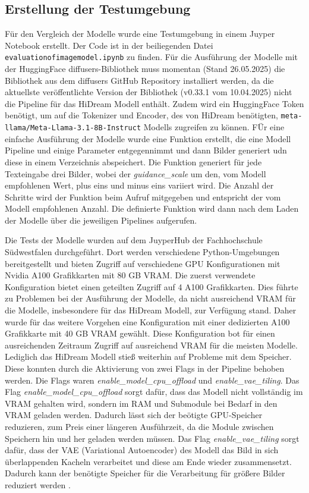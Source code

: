 \subsection{Erstellung der Testumgebung}
Für den Vergleich der Modelle wurde eine Testumgebung in einem Juyper Notebook erstellt. Der Code ist in der beiliegenden Datei \texttt{evaluation\-of\-image\-model.ipynb} zu finden. 
Für die Ausführung der Modelle mit der HuggingFace diffusers-Bibliothek \cite{von-platen-etal-2022-diffusers} muss momentan (Stand 26.05.2025) die Bibliothek aus dem diffusers GitHub Repository installiert werden, da die aktuellste veröffentlichte Version der Bibliothek (v0.33.1 vom 10.04.2025) nicht die Pipeline für das HiDream Modell enthält. Zudem wird ein HuggingFace Token benötigt, um auf die Tokenizer und Encoder, des von HiDream benötigten, \texttt{meta-llama/Meta-Llama-3.1-8B-Instruct} Modells zugreifen zu können.
FÜr eine einfache Ausführung der Modelle wurde eine Funktion erstellt, die eine Modell Pipeline und einige Parameter entgegennimmt und dann Bilder generiert udn diese in einem Verzeichnis abspeichert. Die Funktion generiert für jede Texteingabe drei Bilder, wobei der \emph{guidance\_scale} um den, vom Modell empfohlenen Wert, plus eins und minus eins variiert wird. Die Anzahl der Schritte wird der Funktion beim Aufruf mitgegeben und entspricht der vom Modell empfohlenen Anzahl.
Die definierte Funktion wird dann nach dem Laden der Modelle über die jeweiligen Pipelines aufgerufen.

Die Tests der Modelle wurden auf dem JuyperHub der Fachhochschule Südwestfalen durchgeführt. Dort werden verschiedene Python-Umgebungen bereitgestellt und bieten Zugriff auf verschiedene GPU Konfigurationen mit Nvidia A100 Grafikkarten mit 80 GB VRAM. Die zuerst verwendete Konfiguration bietet einen geteilten Zugriff auf 4 A100 Grafikkarten. Dies führte zu Problemen bei der Ausführung der Modelle, da nicht ausreichend VRAM für die Modelle, insbesondere für das HiDream Modell, zur Verfügung stand. Daher wurde für das weitere Vorgehen eine Konfiguration mit einer dedizierten A100 Grafikkarte mit 40 GB VRAM gewählt.
Diese Konfiguration bot für einen ausreichenden Zeitraum Zugriff auf ausreichend VRAM für die meisten Modelle. Lediglich das HiDream Modell stieß weiterhin auf Probleme mit dem Speicher. Diese konnten durch die Aktivierung von zwei Flags in der Pipeline behoben werden. Die Flags waren \emph{enable\_model\_cpu\_offload} und \emph{enable\_vae\_tiling}. Das Flag \emph{enable\_model\_cpu\_offload} sorgt dafür, dass das Modell nicht vollständig im VRAM gehalten wird, sondern im RAM und Submodule bei Bedarf in den VRAM geladen werden. Dadurch lässt sich der beötigte GPU-Speicher reduzieren, zum Preis einer längeren Ausführzeit, da die Module zwischen Speichern hin und her geladen werden müssen.
Das Flag \emph{enable\_vae\_tiling} sorgt dafür, dass der VAE (Variational Autoencoder) des Modell das Bild in sich überlappenden Kacheln verarbeitet und diese am Ende wieder zusammensetzt. Dadurch kann der benötigte Speicher für die Verarbeitung für größere Bilder reduziert werden \cite{hf-memory-optimization}.

